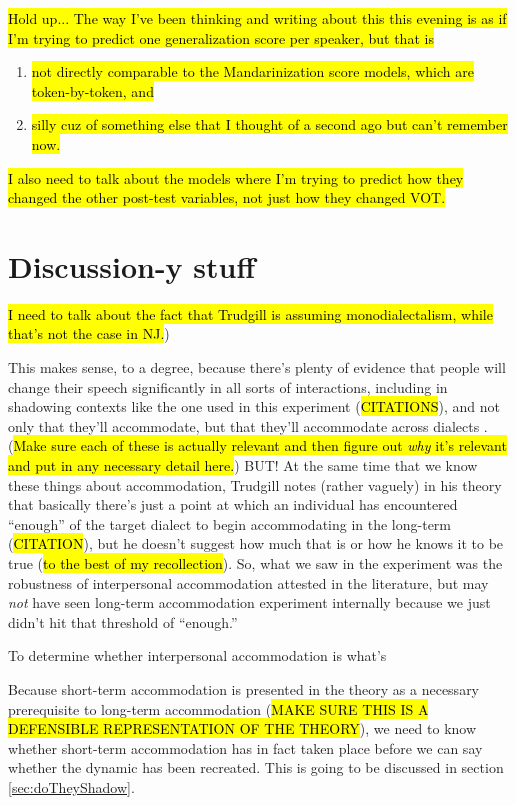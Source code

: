 \hl{Hold up... The way I've been thinking and writing about this this evening is as if I'm trying to predict one generalization score per speaker, but that is} \begin{enumerate}
\item \hl{not directly comparable to the Mandarinization score models, which are token-by-token, and}
\item \hl{silly cuz of something else that I thought of a second ago but can't remember now.}
\end{enumerate}


\hl{I also need to talk about the models where I'm trying to predict how they changed the other post-test variables, not just how they changed VOT.}


\section{Discussion-y stuff}
\hl{I need to talk about the fact that Trudgill is assuming monodialectalism, while that's not the case in NJ.})

This makes sense, to a degree, because there's plenty of evidence that people will change their speech significantly in all sorts of interactions, including in shadowing contexts like the one used in this experiment (\hl{CITATIONS}), and not only that they'll accommodate, but that they'll accommodate across dialects \citep{delvaux2007influence,babel2010dialect,clopper2014sound}. (\hl{Make sure each of these is actually relevant and then figure out \textit{why} it's relevant and put in any necessary detail here.}) BUT! At the same time that we know these things about accommodation, Trudgill notes (rather vaguely) in his theory that basically there's just a point at which an individual has encountered ``enough'' of the target dialect to begin accommodating in the long-term (\hl{CITATION}), but he doesn't suggest how much that is or how he knows it to be true (\hl{to the best of my recollection}). So, what we saw in the experiment was the robustness of interpersonal accommodation attested in the literature, but may \textit{not} have seen long-term accommodation experiment internally because we just didn't hit that threshold of ``enough.''

To determine whether interpersonal accommodation is what's 

Because short-term accommodation is presented in the theory as a necessary prerequisite to long-term accommodation (\hl{MAKE SURE THIS IS A DEFENSIBLE REPRESENTATION OF THE THEORY}), we need to know whether short-term accommodation has in fact taken place before we can say whether the dynamic has been recreated. This is going to be discussed in section \ref{sec:doTheyShadow}.

